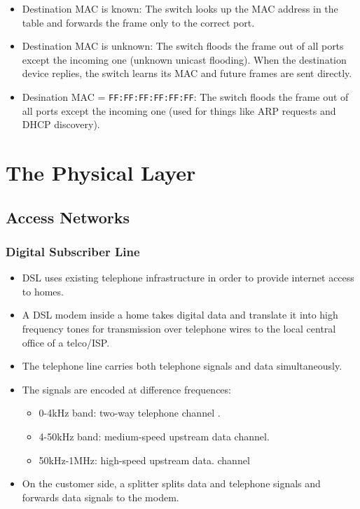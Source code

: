 \documentclass{article}
\begin{document}
\begin{itemize}
    \item Destination MAC is known: The switch looks up the MAC address in the table and forwards the frame only to the correct port.
    \item Destination MAC is unknown: The switch floods the frame out of all ports except the incoming one (unknown unicast flooding). When the destination device replies, the switch learns its MAC and future frames are sent directly.
    \item Desination MAC = \texttt{FF:FF:FF:FF:FF:FF}: The switch floods the frame out of all ports except the incoming one (used for things like ARP requests and DHCP discovery).
\end{itemize}

\section{The Physical Layer}

\subsection{Access Networks}

\subsubsection{Digital Subscriber Line}

\begin{itemize}
    \item DSL uses existing telephone infrastructure in order to provide internet access to homes.
    \item A DSL modem inside a home takes digital data and translate it into high frequency tones for transmission over telephone wires to the local central office of a telco/ISP.
    \item The telephone line carries both telephone signals and data simultaneously.
    \item The signals are encoded at difference frequences:
    \begin{itemize}
        \item 0-4kHz band: two-way telephone channel .
        \item 4-50kHz band: medium-speed upstream data channel.
        \item 50kHz-1MHz: high-speed upstream data. channel
    \end{itemize}
    \item On the customer side, a splitter splits data and telephone signals and forwards data signals to the modem.
\end{itemize}
\end{document}
